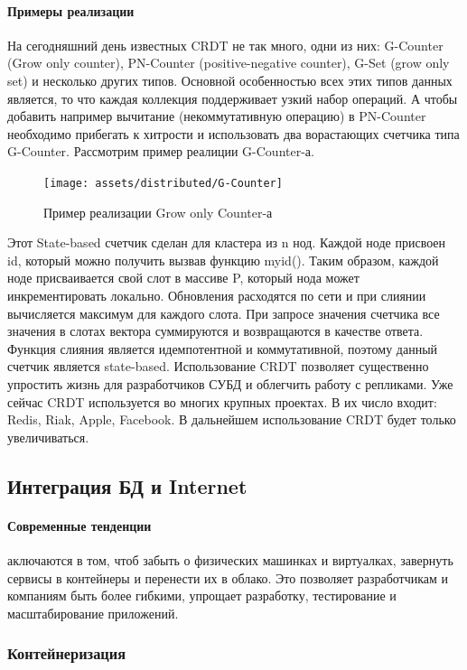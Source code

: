 \paragraph{Примеры реализации}
На сегодняшний день известных CRDT не так много, одни из них: G-Counter (Grow only counter), PN-Counter (positive-negative counter), G-Set (grow only set) и несколько других типов. Основной особенностью всех этих типов данных является, то что каждая коллекция поддерживает узкий набор операций. А чтобы добавить например вычитание (некоммутативную операцию) в PN-Counter необходимо прибегать к хитрости и использовать два ворастающих счетчика типа G-Counter. Рассмотрим пример реалиции G-Counter-а. 
\begin{figure}[H]
    \centering
    \texttt{[image: assets/distributed/G-Counter]}
    \caption{Пример реализации Grow only Counter-а}
    \label{fig:G-Counter}
\end{figure}
Этот State-based счетчик сделан для кластера из n нод. Каждой ноде присвоен id, который можно получить вызвав функцию myid(). Таким образом, каждой ноде присваивается свой слот в массиве P, который нода может инкрементировать локально. Обновления расходятся по сети и при слиянии вычисляется максимум для каждого слота. При запросе значения счетчика все значения в слотах вектора суммируются и возвращаются в качестве ответа. Функция слияния является идемпотентной и коммутативной, поэтому данный счетчик является state-based.
Использование CRDT позволяет существенно упростить жизнь для разработчиков СУБД и облегчить работу с репликами. Уже сейчас CRDT используется во многих крупных проектах. В их число входит: Redis, Riak, Apple, Facebook. В дальнейшем использование CRDT будет только увеличиваться. 

\subsection{Интеграция БД и Internet}

\paragraph{Современные тенденции}

аключаются в том, чтоб забыть о физических машинках и виртуалках, завернуть сервисы в контейнеры и перенести их в облако. Это позволяет разработчикам и компаниям быть более гибкими, 
упрощает разработку, тестирование и масштабирование приложений.

\subsubsection{Контейнеризация}

